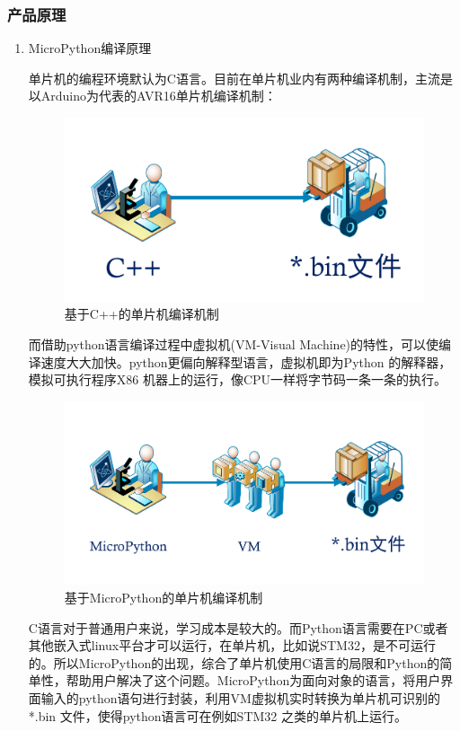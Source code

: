 \documentclass[UTF-8,12pt,a4paper]{ctexart}
\begin{document}
\subsubsection{产品原理}
\begin{enumerate}[(1)]
\item MicroPython编译原理

      单片机的编程环境默认为C语言。目前在单片机业内有两种编译机制，主流是以Arduino为代表的AVR16单片机编译机制：

     \begin{figure}[H]
     \centering
     \includegraphics[width=12cm]{3_Cbin.pdf}
     \caption{基于C++的单片机编译机制}
     \label{基于C++的单片机编译机制}
     \end{figure}

     而借助python语言编译过程中虚拟机(VM-Visual Machine)的特性，可以使编译速度大大加快。python更偏向解释型语言，虚拟机即为Python 的解释器，模拟可执行程序X86 机器上的运行，像CPU一样将字节码一条一条的执行。

      \begin{figure}[H]
      \centering
      \includegraphics[width=12cm]{3_Pbin.pdf}
      \caption{基于MicroPython的单片机编译机制}
      \label{基于MicroPython的单片机编译机制}
      \end{figure}

      C语言对于普通用户来说，学习成本是较大的。而Python语言需要在PC或者其他嵌入式linux平台才可以运行，在单片机，比如说STM32，是不可运行的。所以MicroPython的出现，综合了单片机使用C语言的局限和Python的简单性，帮助用户解决了这个问题。MicroPython为面向对象的语言，将用户界面输入的python语句进行封装，利用VM虚拟机实时转换为单片机可识别的*.bin 文件，使得python语言可在例如STM32 之类的单片机上运行。


\end{enumerate}
\end{document}
